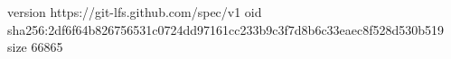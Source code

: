 version https://git-lfs.github.com/spec/v1
oid sha256:2df6f64b826756531c0724dd97161cc233b9c3f7d8b6c33eaec8f528d530b519
size 66865
